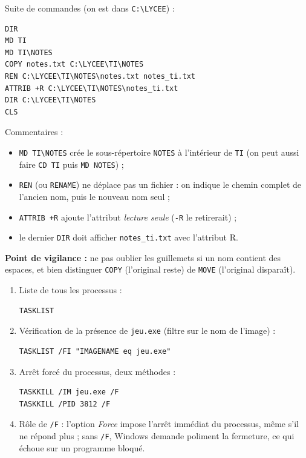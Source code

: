 \documentclass[11pt]{article}
\begin{document}
\begin{corrige}
Suite de commandes (on est dans \texttt{C:\textbackslash LYCEE}) :
\begin{lstlisting}
DIR
MD TI
MD TI\NOTES
COPY notes.txt C:\LYCEE\TI\NOTES
REN C:\LYCEE\TI\NOTES\notes.txt notes_ti.txt
ATTRIB +R C:\LYCEE\TI\NOTES\notes_ti.txt
DIR C:\LYCEE\TI\NOTES
CLS
\end{lstlisting}
Commentaires :
\begin{itemize}
  \item \texttt{MD TI\textbackslash NOTES} crée le sous-répertoire \texttt{NOTES} à l'intérieur de \texttt{TI} (on peut aussi faire \texttt{CD TI} puis \texttt{MD NOTES}) ;
  \item \texttt{REN} (ou \texttt{RENAME}) ne déplace pas un fichier : on indique le chemin complet de l'ancien nom, puis le nouveau nom seul ;
  \item \texttt{ATTRIB +R} ajoute l'attribut \emph{lecture seule} (\texttt{-R} le retirerait) ;
  \item le dernier \texttt{DIR} doit afficher \texttt{notes\_ti.txt} avec l'attribut R.
\end{itemize}
\textbf{Point de vigilance :} ne pas oublier les guillemets si un nom contient des espaces, et bien distinguer \texttt{COPY} (l'original reste) de \texttt{MOVE} (l'original disparaît).
\end{corrige}

\begin{corrige}
\begin{enumerate}
  \item Liste de tous les processus :
\begin{lstlisting}
TASKLIST
\end{lstlisting}
  \item Vérification de la présence de \texttt{jeu.exe} (filtre sur le nom de l'image) :
\begin{lstlisting}
TASKLIST /FI "IMAGENAME eq jeu.exe"
\end{lstlisting}
  \item Arrêt forcé du processus, deux méthodes :
\begin{lstlisting}
TASKKILL /IM jeu.exe /F
TASKKILL /PID 3812 /F
\end{lstlisting}
  \item Rôle de \texttt{/F} : l'option \emph{Force} impose l'arrêt immédiat du processus, même s'il ne répond plus ; sans \texttt{/F}, Windows demande poliment la fermeture, ce qui échoue sur un programme bloqué.
\end{enumerate}
\end{corrige}
\end{document}
